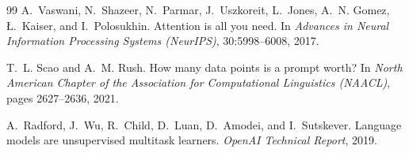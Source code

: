 \documentclass[11pt,a4paper]{article}
\begin{document}
\begin{thebibliography}{99}
A.~Vaswani, N.~Shazeer, N.~Parmar, J.~Uszkoreit, L.~Jones, A.~N. Gomez, {\L}.~Kaiser, and I.~Polosukhin.
\newblock Attention is all you need.
\newblock In \textsl{Advances in Neural Information Processing Systems (NeurIPS)}, 30:5998--6008, 2017.

T.~L. Scao and A.~M. Rush.
\newblock How many data points is a prompt worth?
\newblock In \textsl{North American Chapter of the Association for Computational Linguistics (NAACL)}, pages 2627--2636, 2021.

A.~Radford, J.~Wu, R.~Child, D.~Luan, D.~Amodei, and I.~Sutskever.
\newblock Language models are unsupervised multitask learners.
\newblock \textsl{OpenAI Technical Report}, 2019.
\end{thebibliography}
\end{document}
